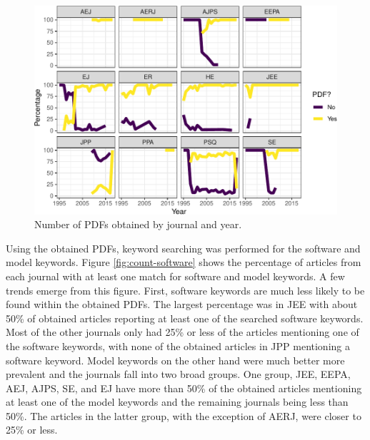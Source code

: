 \documentclass[english,,man]{apa6}
\theoremstyle{definition}
\theoremstyle{definition}
\theoremstyle{definition}
\theoremstyle{remark}
\begin{document}
\begin{figure}
\centering
\includegraphics{software_files/figure-latex/pdf-time-1.pdf}
\caption{\label{fig:pdf-time}Number of PDFs obtained by journal and year.}
\end{figure}

Using the obtained PDFs, keyword searching was performed for the
software and model keywords. Figure \ref{fig:count-software} shows the
percentage of articles from each journal with at least one match for
software and model keywords. A few trends emerge from this figure.
First, software keywords are much less likely to be found within the
obtained PDFs. The largest percentage was in JEE with about 50\% of
obtained articles reporting at least one of the searched software
keywords. Most of the other journals only had 25\% or less of the
articles mentioning one of the software keywords, with none of the
obtained articles in JPP mentioning a software keyword. Model keywords
on the other hand were much better more prevalent and the journals fall
into two broad groups. One group, JEE, EEPA, AEJ, AJPS, SE, and EJ have
more than 50\% of the obtained articles mentioning at least one of the
model keywords and the remaining journals being less than 50\%. The
articles in the latter group, with the exception of AERJ, were closer to
25\% or less.
\end{document}
